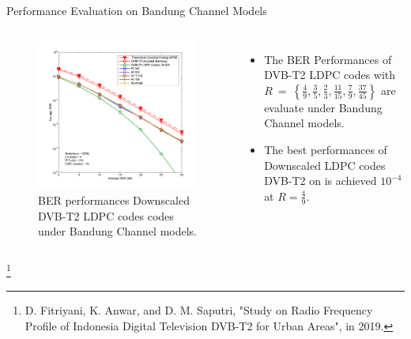 \documentclass[11pt, aspectratio=169]{beamer}
\newcommand\blfootnote[1]{%
  \begingroup
  \renewcommand\thefootnote{}\footnote{#1}%
  \addtocounter{footnote}{-1}%
  \endgroup
}
\begin{document}
\begin{frame}{Performance Evaluation on Bandung Channel Models}
\begin{columns}

\vspace{-25pt}
\begin{figure}
\centering 
\includegraphics[scale=0.4]{gambarafa/coded-2}
\caption{BER performances Downscaled DVB-T2 LDPC codes codes under Bandung Channel models.}
\label{fading} %
\end{figure}
\begin{itemize}

\justifying
\item The BER Performances of DVB-T2 LDPC codes with $R~=~\left \{ \frac{4}{9}, \frac{3}{5}, \frac{2}{3},\frac{11}{15},\frac{7}{9},\frac{37}{45} \right \}$ are evaluate under Bandung Channel models\footnotemark[1].
\item The best performances of Downscaled LDPC codes DVB-T2 on is achieved $10^{-4}$ at $R=\frac{4}{9}.$

\end{itemize}
\end{columns}
\blfootnote{\tiny{D. Fitriyani, K. Anwar, and D. M. Saputri, "Study on Radio Frequency Profile of Indonesia Digital Television DVB-T2 for Urban Areas", in 2019.}}

\end{frame}
\end{document}
